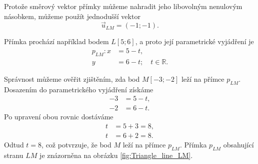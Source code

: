\begin{example}
\begin{enumerate}[label=\alph*), leftmargin=2em]
        Protože směrový vektor přímky můžeme nahradit jeho libovolným nenulovým násobkem, můžeme použít jednodušší vektor
        \[
            \vec{u}_{LM}=(-1;-1).
        \]

        Přímka prochází například bodem $L[5;6]$, a proto její
        parametrické vyjádření je
        \begin{align*}
            p_{LM}: x &= 5-t,\\
                    y &= 6-t;
                    \quad t\in\mathbb{R}.
        \end{align*}

        Správnost můžeme ověřit zjištěním, zda bod $M[-3;-2]$ leží na přímce $p_{LM}$.
        Dosazením do parametrického vyjádření získáme
        \begin{align*}
            -3 &= 5-t,\\
            -2 &= 6-t.
        \end{align*}
        Po upravení obou rovnic dostáváme
        \begin{align*}
            t &= 5+3=8,\\
            t &= 6+2=8.
        \end{align*}
        Odtud $t=8$, což potvrzuje, že bod $M$ leží na přímce $p_{LM}$.
        Přímka $p_{LM}$ obsahující stranu $LM$ je znázorněna na obrázku \ref{fig:Triangle_line_LM}.

        \begin{figure}[H]
            \centering
\end{figure}
\end{enumerate}
\end{example}
